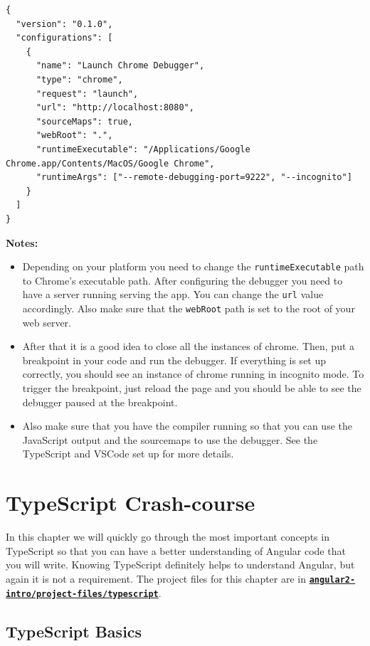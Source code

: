 \documentclass[12pt,]{article}
\begin{document}
\begin{verbatim}
{
  "version": "0.1.0",
  "configurations": [
    {
      "name": "Launch Chrome Debugger",
      "type": "chrome",
      "request": "launch",
      "url": "http://localhost:8080",
      "sourceMaps": true,
      "webRoot": ".",
      "runtimeExecutable": "/Applications/Google Chrome.app/Contents/MacOS/Google Chrome",
      "runtimeArgs": ["--remote-debugging-port=9222", "--incognito"]
    }
  ]
}
\end{verbatim}

\textbf{Notes:}

\begin{itemize}
\item
  Depending on your platform you need to change the
  \texttt{runtimeExecutable} path to Chrome's executable path. After
  configuring the debugger you need to have a server running serving the
  app. You can change the \texttt{url} value accordingly. Also make sure
  that the \texttt{webRoot} path is set to the root of your web server.
\item
  After that it is a good idea to close all the instances of chrome.
  Then, put a breakpoint in your code and run the debugger. If
  everything is set up correctly, you should see an instance of chrome
  running in incognito mode. To trigger the breakpoint, just reload the
  page and you should be able to see the debugger paused at the
  breakpoint.
\item
  Also make sure that you have the compiler running so that you can use
  the JavaScript output and the sourcemaps to use the debugger. See the
  TypeScript and VSCode set up for more details.
\end{itemize}

\section{TypeScript Crash-course}\label{typescript-crash-course}

In this chapter we will quickly go through the most important concepts
in TypeScript so that you can have a better understanding of Angular
code that you will write. Knowing TypeScript definitely helps to
understand Angular, but again it is not a requirement. The project files
for this chapter are in
\href{https://github.com/aminmeyghani/angular2-intro/tree/master/project-files/typescript}{\textbf{\texttt{angular2-intro/project-files/typescript}}}.

\subsection{TypeScript Basics}\label{typescript-basics}
\end{document}
